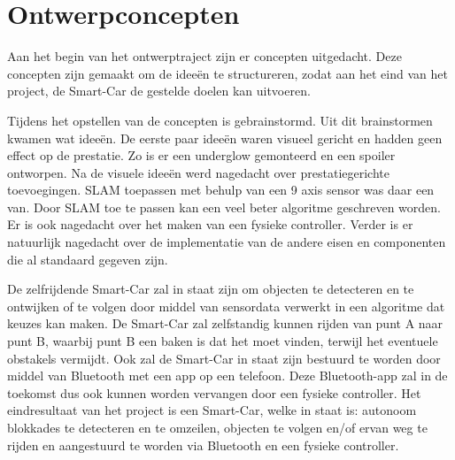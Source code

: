 \section{Ontwerpconcepten}
Aan het begin van het ontwerptraject zijn er concepten uitgedacht. Deze concepten zijn gemaakt om de ideeën te structureren, zodat aan het eind van het project, de \gls{Smart-Car} de gestelde doelen kan uitvoeren. 

Tijdens het opstellen van de concepten is gebrainstormd. Uit dit brainstormen kwamen wat ideeën. De eerste paar ideeën waren visueel gericht en hadden geen effect op de prestatie. Zo is er een \gls{underglow} gemonteerd en een spoiler ontworpen. 
Na de visuele ideeën werd nagedacht over prestatiegerichte toevoegingen. \gls{SLAM} toepassen met behulp van een 9 axis sensor was daar een van. Door \gls{SLAM} toe te passen kan een veel beter algoritme geschreven worden. Er is ook nagedacht over het maken van een fysieke controller. 
Verder is er natuurlijk nagedacht over de implementatie van de andere eisen en componenten die al standaard gegeven zijn. 

De zelfrijdende \gls{Smart-Car} zal in staat zijn om objecten te detecteren en te ontwijken of te volgen door middel van sensordata verwerkt in een algoritme dat keuzes kan maken. De \gls{Smart-Car} zal zelfstandig kunnen rijden van punt A naar punt B, waarbij punt B een baken is dat het moet vinden, terwijl het eventuele obstakels vermijdt. 
Ook zal de \gls{Smart-Car} in staat zijn bestuurd te worden door middel van \gls{Bluetooth} met een app op een telefoon. Deze \gls{Bluetooth}-app zal in de toekomst dus ook kunnen worden vervangen door een fysieke controller.
Het eindresultaat van het project is een \gls{Smart-Car}, welke in staat is: \gls{autonoom} blokkades te detecteren en te omzeilen, objecten te volgen en/of ervan weg te rijden en aangestuurd te worden via \gls{Bluetooth} en een fysieke controller. 

